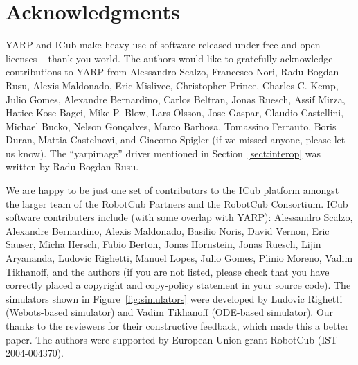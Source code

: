 
\section{Acknowledgments}

YARP and ICub make heavy use of software released under free and open
licenses -- thank you world.
%
The authors would like to gratefully acknowledge contributions to YARP
from Alessandro Scalzo, Francesco Nori, Radu Bogdan Rusu, 
Alexis Maldonado, Eric Mislivec, Christopher
Prince, Charles C. Kemp, Julio Gomes, Alexandre
Bernardino, Carlos Beltran, Jonas Ruesch, Assif Mirza, Hatice
Kose-Bagci, Mike P. Blow, Lars Olsson,
Jose Gaspar, Claudio Castellini, Michael Bucko, Nelson
Gon\c calves, Marco Barbosa, Tomassino Ferrauto, Boris Duran, Mattia
Castelnovi, and Giacomo Spigler 
 (if we missed anyone, please let us
know).  
%
The ``yarpimage'' driver mentioned in Section~\ref{sect:interop}
was written by Radu Bogdan Rusu.

We are happy to be just one set of contributors to the ICub platform
amongst the larger team of the RobotCub Partners and the RobotCub
Consortium.
%
ICub software contributers include (with some overlap with YARP):
Alessandro Scalzo, Alexandre Bernardino, Alexis Maldonado, Basilio
Noris, David Vernon, Eric Sauser, Micha Hersch, Fabio Berton, 
Jonas Hornstein, Jonas Ruesch, Lijin Aryananda, 
Ludovic Righetti, Manuel Lopes, Julio Gomes, Plinio
Moreno, Vadim Tikhanoff, and 
the authors (if you are not listed, please check that
you have correctly placed a copyright and copy-policy statement in
your source code).
%
%
The simulators shown in Figure~\ref{fig:simulators} were developed 
by Ludovic Righetti (Webots-based simulator) and
Vadim Tikhanoff (ODE-based simulator).
%
Our thanks to the reviewers for their constructive feedback, which
made this a better paper.
%
The authors were supported by European Union
grant RobotCub (IST-2004-004370).




